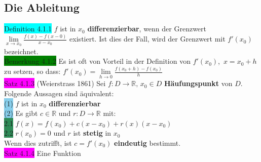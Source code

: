 \documentclass[landscape, 10pt]{article}
\newcommand{\R}{\mathbb{R}}
\begin{document}
\begin{multicols}{3}
       \subsection{Die Ableitung}
              \colorbox{cyan}{Definition 4.1.1} 
                     $f$ ist in $x_0$ \textbf{differenzierbar}, 
                     wenn der Grenzwert \textcolor{NavyBlue}{
                     $\lim\limits_{x\to x_0}\frac{f(x)-f(x-0)}{x-x_0}$}
                     existiert. Ist dies der Fall, wird 
                     der Grenzwert mit \textcolor{NavyBlue}{$f'(x_0)$} bezeichnet.\\
              \colorbox{green}{Bemerkung 4.1.2} 
                     Es ist oft von Vorteil in der Definition von 
                     \textcolor{NavyBlue}{$f'(x_0)$},\,
                     \textcolor{NavyBlue}{$x=x_0+h$} zu setzen, so dass: 
                     \textcolor{NavyBlue}{
                     $f'(x_0)=\lim\limits_{h\to 0}\frac{f(x_0+h)-f(x_0)}{h}$}\\
              \colorbox{magenta}{Satz 4.1.3} (Weierstrass 1861) Sei 
                     \textcolor{NavyBlue}{$f:D\longrightarrow\R,\,x_0\in D$}
                     \textbf{Häufungspunkt} von \textcolor{NavyBlue}{$D$}. 
                     Folgende Aussagen sind 
                     äquivalent: \\
                     \colorbox{SkyBlue}{(1)} \textcolor{NavyBlue}{$f$} ist in 
                            \textcolor{NavyBlue}{$x_0$} 
                            \textbf{differenzierbar} \\
                     \colorbox{SkyBlue}{(2)} Es gibt 
                            \textcolor{NavyBlue}{$c\in\R$} und 
                            \textcolor{NavyBlue}{$r:D\longrightarrow\R$} mit: \\
                            \colorbox{SeaGreen}{2.1} 
                                   \textcolor{NavyBlue}{
                                   $f(x)=f(x_0)+c(x-x_0)+r(x)(x-x_0)$} \\
                            \colorbox{SeaGreen}{2.2} 
                                   \textcolor{NavyBlue}{$r(x_0)=0$} und 
                                   \textcolor{NavyBlue}{$r$} ist \textbf{stetig}
                                   in \textcolor{NavyBlue}{$x_0$}\\
                     Wenn dies zutrifft, ist \textcolor{NavyBlue}{$c=f'(x_0)$} 
                     \textbf{eindeutig} bestimmt.\\
              \colorbox{magenta}{Satz 4.1.4} Eine Funktion 

\end{multicols}
\end{document}
